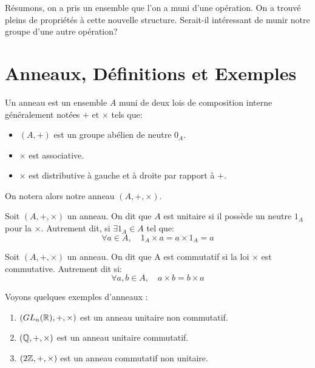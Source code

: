 
\minitoc  %

Résumons, on a pris un ensemble que l'on a muni d'une opération. On a trouvé pleins de propriétés à cette nouvelle structure.
Serait-il intéressant de munir notre groupe d'une autre opération? 


\section{Anneaux, Définitions et Exemples}

\begin{definition}[Anneaux]
    Un anneau est un ensemble $A$ muni de deux lois de composition interne généralement notées $+$ et $\times$
    tels que:
    \begin{itemize}
        \item $(A,+)$ est un groupe abélien de neutre $0_A$. 
        \item $\times$ est associative. 
        \item $\times$ est distributive à gauche et à droite par rapport à $+$. 
    \end{itemize}    
    On notera alors notre anneau $(A,+,\times)$. 
\end{definition}

\begin{definition}
    Soit $(A,+,\times)$ un anneau. On dit que $A$ est unitaire si il possède un neutre $1_A$ pour la $\times$. 
    Autrement dit, si $ \exists 1_A \in A$ tel que:
        \[ \forall a \in A, \quad 1_A \times a = a \times 1_A = a \] 
\end{definition}

\begin{definition}
    Soit $(A,+,\times)$ un anneau. On dit que A est commutatif si la loi $\times$ est commutative. 
    Autrement dit si: 
        \[ \forall a,b \in A, \quad a \times b = b \times a \] 
\end{definition}

\begin{example}
    Voyons quelques exemples d'anneaux :
    \begin{enumerate}
        \item $(GL_n(\mathbb{R}),+,\times)$ est un anneau unitaire non commutatif. 
        \item $(\mathbb{Q},+,\times)$ est un anneau unitaire commutatif. 
        \item $(2\mathbb{Z},+,\times)$ est un anneau commutatif non unitaire. 
    \end{enumerate}
\end{example}

